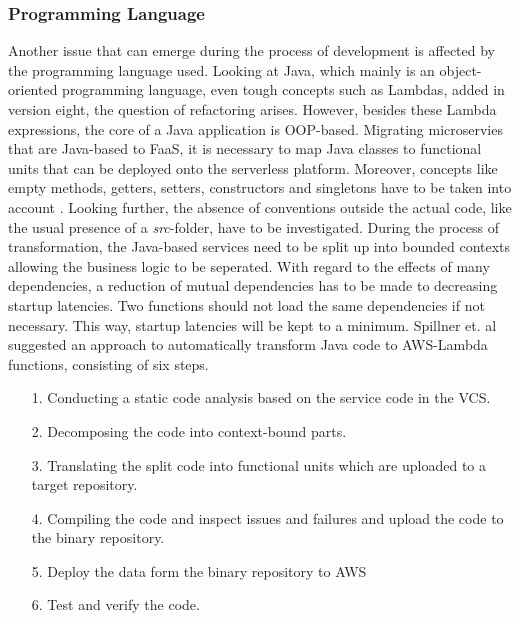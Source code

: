 \documentclass[11pt]{article}
\begin{document}
\subsubsection{Programming Language}
 Another issue that can emerge during the process of development is affected by the programming language used. Looking at Java, which mainly is an object-oriented programming language, even tough concepts such as Lambdas, added in version eight, the question of refactoring arises. However, besides these Lambda expressions, the core of a Java application is OOP-based. Migrating microservies that are Java-based to FaaS, it is necessary to map Java classes to functional units that can be deployed onto the serverless platform. Moreover, concepts like empty methods, getters, setters, constructors and singletons have to be taken into account \cite{spillner2017Java}. Looking further, the absence of conventions outside the actual code, like the usual presence of a \textit{src}-folder, have to be investigated. During the process of transformation, the Java-based services need to be split up into bounded contexts allowing the business logic to be seperated. With regard to the effects of many dependencies, a reduction of mutual dependencies has to be made to decreasing startup latencies. Two functions should not load the same dependencies if not necessary. This way, startup latencies will be kept to a minimum. Spillner et. al suggested an approach to automatically transform Java code to AWS-Lambda functions, consisting of six steps.
\begin{itemize}
  \item[1.] Conducting a static code analysis based on the service code in the VCS.
  \item[2.] Decomposing the code into context-bound parts.
  \item[3.] Translating the split code into functional units which are uploaded to a target repository. 
  \item[4.] Compiling the code and inspect issues and failures and upload the code to the binary repository. 
  \item[5.] Deploy the data form the binary repository to AWS
  \item[6.] Test and verify the code.
\end{itemize}
\end{document}
